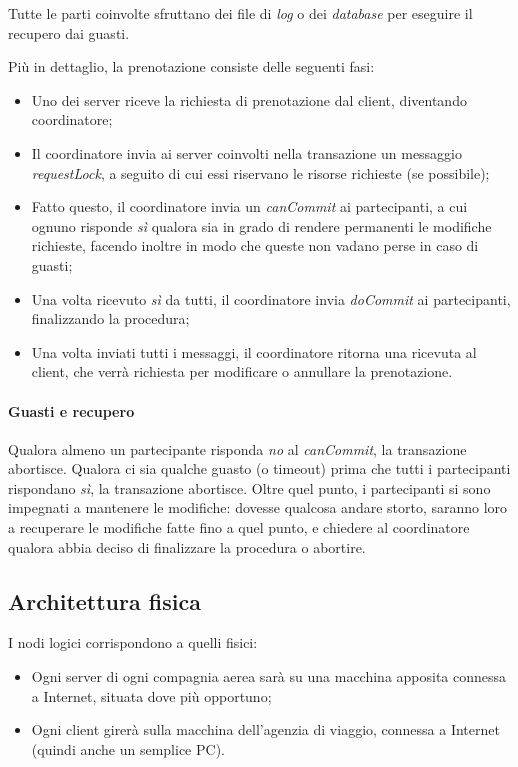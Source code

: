 \documentclass[a4paper]{article}
\begin{document}
Tutte le parti coinvolte sfruttano dei file di \textit{log} o dei \textit{database} per eseguire il recupero dai guasti.

Più in dettaglio, la prenotazione consiste delle seguenti fasi:
\begin{itemize}
	\item Uno dei server riceve la richiesta di prenotazione dal client, diventando coordinatore;
	\item Il coordinatore invia ai server coinvolti nella transazione un messaggio \textit{requestLock}, a seguito di cui essi riservano le risorse richieste (se possibile);
	\item Fatto questo, il coordinatore invia un \textit{canCommit} ai partecipanti, a cui ognuno risponde \textit{sì} qualora sia in grado di rendere permanenti le modifiche richieste, facendo inoltre in modo che queste non vadano perse in caso di guasti;
	\item Una volta ricevuto \textit{sì} da tutti, il coordinatore invia \textit{doCommit} ai partecipanti, finalizzando la procedura;
	\item Una volta inviati tutti i messaggi, il coordinatore ritorna una ricevuta al client, che verrà richiesta per modificare o annullare la prenotazione.
\end{itemize}

\paragraph{Guasti e recupero} Qualora almeno un partecipante risponda \textit{no} al \textit{canCommit}, la transazione abortisce. Qualora ci sia qualche guasto (o timeout) prima che tutti i partecipanti rispondano \textit{sì}, la transazione abortisce. Oltre quel punto, i partecipanti si sono impegnati a mantenere le modifiche: dovesse qualcosa andare storto, saranno loro a recuperare le modifiche fatte fino a quel punto, e chiedere al coordinatore qualora abbia deciso di finalizzare la procedura o abortire.


\subsection{Architettura fisica}
I nodi logici corrispondono a quelli fisici:
\begin{itemize}
	\item Ogni server di ogni compagnia aerea sarà su una macchina apposita connessa a Internet, situata dove più opportuno;
	\item Ogni client girerà sulla macchina dell'agenzia di viaggio, connessa a Internet (quindi anche un semplice PC).
\end{itemize}
\end{document}

